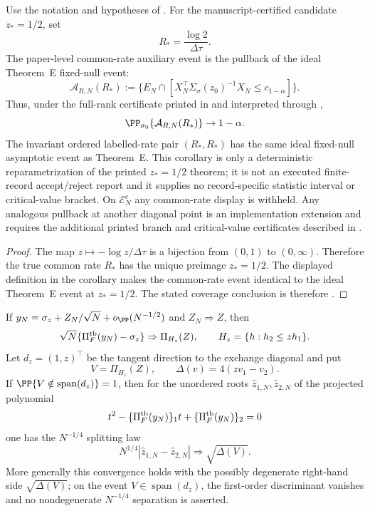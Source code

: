 \begin{corollary}\label{cor:exchange-diagonal-common-rate-confidence-main}
Use the notation and hypotheses of
.
For the manuscript-certified candidate \(z_*=1/2\), set
\[
R_*=\frac{\log2}{\Delta\tau}.
\]
The paper-level common-rate auxiliary event is the pullback of the ideal
Theorem~E fixed-null event:
\[
\mathcal A_{R,N}(R_*)
:=\{E_N\cap[
X_N^\top\Sigma_\sigma(z_0)^{-1}X_N\le c_{1-\alpha}]\}.
\]
Thus, under the full-rank certificate printed in
 and interpreted through
,
\[
\PP_{\sigma_0}\{\mathcal A_{R,N}(R_*)\}\to1-\alpha .
\]
The invariant ordered labelled-rate pair \((R_*,R_*)\) has the same
ideal fixed-null asymptotic event as Theorem~E.  This corollary is only a
deterministic reparametrization of the printed \(z_*=1/2\) theorem; it is not
an executed finite-record accept/reject report and it supplies no
record-specific statistic interval or critical-value bracket.  On \(\mathcal E_N^c\) any
common-rate display is withheld.  Any analogous pullback at another diagonal
point is an implementation extension and requires the additional printed
branch and critical-value certificates described in
.
\end{corollary}

\begin{proof}
The map \(z\mapsto-\log z/\Delta\tau\) is a bijection from \((0,1)\) to
\((0,\infty)\).  Therefore the true common rate \(R_*\) has the unique
preimage \(z_*=1/2\).  The displayed definition in the corollary makes the
common-rate event identical to the ideal Theorem~E event at \(z_*=1/2\).  The
stated coverage conclusion is therefore
.
\end{proof}

\fi
\begin{lemma}\label{lem:exchange-diagonal-projection-main}
If \(y_N=\sigma_z+Z_N/\sqrt N+o_{\PP}(N^{-1/2})\) and
\(Z_N\Rightarrow Z\), then
\[
\sqrt N\{\Pi_F^{\rm tb}(y_N)-\sigma_z\}\Rightarrow \Pi_{H_z}(Z),
\qquad H_z=\{h:h_2\le zh_1\}.
\]
Let \(d_z=(1,z)^\top\) be the tangent direction to the exchange diagonal and
put
\[
V=\Pi_{H_z}(Z),\qquad
\Delta(v)=4(zv_1-v_2).
\]
If \(\PP\{V\notin\operatorname{span}(d_z)\}=1\), then for the unordered roots
\(\widehat z_{1,N},\widehat z_{2,N}\) of the projected polynomial
\[
t^2-\{\Pi_F^{\rm tb}(y_N)\}_1t+\{\Pi_F^{\rm tb}(y_N)\}_2=0
\]
one has the \(N^{-1/4}\) splitting law
\[
N^{1/4}|\widehat z_{1,N}-\widehat z_{2,N}|
\Rightarrow \sqrt{\Delta(V)} .
\]
More generally this convergence holds with the possibly degenerate right-hand
side \(\sqrt{\Delta(V)}\); on the event
\(V\in\operatorname{span}(d_z)\), the first-order discriminant vanishes and no
nondegenerate \(N^{-1/4}\) separation is asserted.
\end{lemma}

